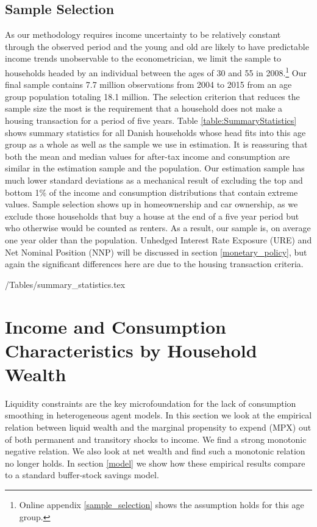 \documentclass[titlepage]{\econtex}\newcommand{\texname}{ConsumptionHeterogeneity}
\begin{document}
\subsection{Sample Selection}
As our methodology requires income uncertainty to be relatively constant through the observed period and the young and old are likely to have predictable income trends unobservable to the econometrician, we limit the sample to households headed by an individual between the ages of 30 and 55 in 2008.\footnote{Online appendix \ref{sample_selection} shows the assumption holds for this age group.} Our final sample contains 7.7 million observations from 2004 to 2015 from an age group population totaling 18.1 million. The selection criterion that reduces the sample size the most is the requirement that a household does not make a housing transaction for a period of five years. Table \ref{table:SummaryStatistics} shows summary statistics for all Danish households whose head fits into this age group as a whole as well as the sample we use in estimation. It is reassuring that both the mean and median values for after-tax income and consumption are similar in the estimation sample and the population. Our estimation sample has much lower standard deviations as a mechanical result of excluding the top and bottom 1\% of the income and consumption distributions that contain extreme values. Sample selection shows up in homeownership and car ownership, as we exclude those households that buy a house at the end of a five year period but who otherwise would be counted as renters. As a result, our sample is, on average one year older than the population. Unhedged Interest Rate Exposure (URE) and Net Nominal Position (NNP) will be discussed in section \ref{monetary_policy}, but again the significant differences here are due to the housing transaction criteria. 
\begin{center} 
	\label{table:SummaryStatistics}
	\econtexRoot/Tables/summary_statistics.tex 
\end{center}

\section{Income and Consumption Characteristics by Household Wealth} \label{MPX_wealth}
Liquidity constraints are the key microfoundation for the lack of consumption smoothing in heterogeneous agent models. In this section we look at the empirical relation between liquid wealth and the marginal propensity to expend (MPX) out of both permanent and transitory shocks to income. We find a strong monotonic negative relation. We also look at net wealth and find such a monotonic relation no longer holds. In section \ref{model} we show how these empirical results compare to a standard buffer-stock savings model.
\end{document}
